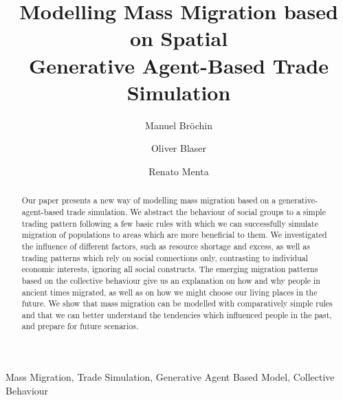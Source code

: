 \documentclass{JASSS}
\title{Modelling Mass Migration based on Spatial\\ Generative Agent-Based Trade Simulation}
\author[1]{Manuel Bröchin}
\affil[1]{Swiss Federal Institute of Technology in Zurich, Rämistr. 101, CH-8092 Zürich, Switzerland}
\author[1]{Oliver Blaser}
\author[1]{Renato Menta}
\begin{document}
\maketitle 



\begin{abstract}
Our paper presents a new way of modelling mass migration based on a generative-agent-based trade simulation. We abstract the behaviour of social groups to a simple trading pattern following a few basic rules with which we can successfully simulate migration of populations to areas which are more beneficial to them. We investigated the influence of different factors, such as resource shortage and excess, as well as trading patterns which rely on social connections only, contrasting to individual economic interests, ignoring all social constructs. The emerging migration patterns based on the collective behaviour give us an explanation on how and why people in ancient times migrated, as well as on how we might choose our living places in the future. We show that mass migration can be modelled with comparatively simple rules and that we can better understand the tendencies which influenced people in the past, and prepare for future scenarios.
\end{abstract}

\begin{keywords}
Mass Migration, Trade Simulation, Generative Agent Based Model, Collective Behaviour
\end{keywords}

\parano{}



\end{document}

